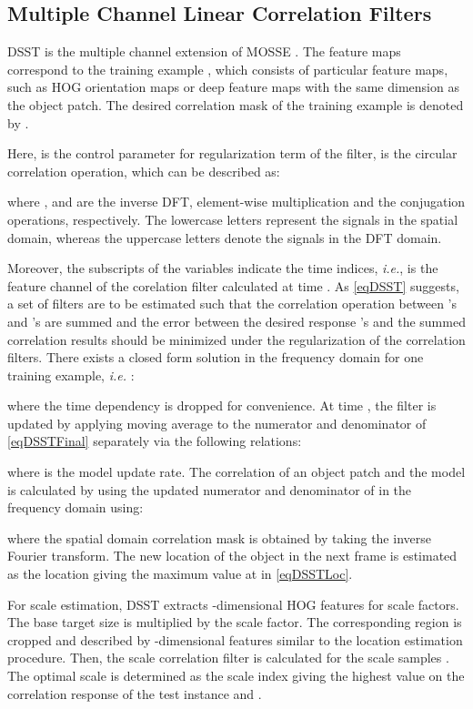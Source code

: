 \documentclass[journal]{IEEEtran}
\begin{document}
\subsection{Multiple Channel Linear Correlation Filters}
\label{secDSST}
DSST \cite{DSST} is the multiple channel extension of MOSSE \cite{MOSSE}. The feature maps  correspond to the training example , which consists of particular feature maps, such as HOG orientation maps or deep feature maps with the same dimension as the object patch. The desired correlation mask of the training example  is denoted by .

Here,  is the control parameter for  regularization term of the filter,  is the circular correlation operation, which can be described as:

where ,  and  are the inverse DFT, element-wise multiplication and the conjugation operations, respectively. The lowercase letters represent the signals in the spatial domain, whereas the uppercase letters denote the signals in the DFT domain.

Moreover, the subscripts of the variables indicate the time indices, \emph{i.e.},  is the  feature channel of the corelation filter calculated at time . As \eqref{eqDSST} suggests, a set of filters  are to be estimated such that the correlation operation between 's and 's are summed and the error between the desired response 's and the summed correlation results  should be minimized under the  regularization of the correlation filters. There exists a closed form solution in the frequency domain for one training example, \emph{i.e.} :

where the time dependency is dropped for convenience. At time , the filter  is updated by applying moving average to the numerator and denominator of \eqref{eqDSSTFinal} separately via the following relations:

where  is the model update rate. The correlation of an object patch  and the model  is calculated by using the updated numerator  and denominator  of  in the frequency domain using:

where the spatial domain correlation mask is obtained by taking the inverse Fourier transform.
The new location of the object in the next frame is estimated as the location giving the maximum value at  in \eqref{eqDSSTLoc}. 

For scale estimation, DSST extracts -dimensional HOG features for  scale factors. The base target size is multiplied by the scale factor. The corresponding region is cropped and described by -dimensional features similar to the location estimation procedure. Then, the scale correlation filter  is calculated for the scale samples . The optimal scale is determined as the scale index giving the highest value on the correlation response of the test instance  and .
\end{document}
